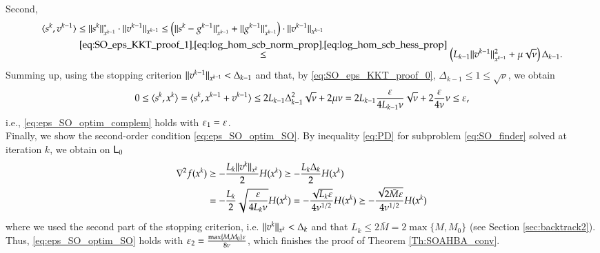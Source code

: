 Second, 
\begin{align*}
 \langle s^{k},v^{k-1}\rangle&\leq \lVert s^{k}\rVert^{\ast}_{x^{k-1}}\cdot\lVert v^{k-1}\rVert_{x^{k-1}}\leq \left(\lVert s^{k}-g^{k-1}\rVert^{\ast}_{x^{k-1}}+\lVert g^{k-1}\rVert^{\ast}_{x^{k-1}}\right)\cdot \lVert v^{k-1}\rVert_{x^{k-1}}\\
&\stackrel{\eqref{eq:SO_eps_KKT_proof_1},\eqref{eq:log_hom_scb_norm_prop},\eqref{eq:log_hom_scb_hess_prop}}{\leq}  \left( L_{k-1}\lVert v^{k-1}\rVert^{2}_{x^{k-1}}+\mu\sqrt{\nu}\right)\Delta_{k-1}.
\end{align*}
Summing up, using the stopping criterion $\lVert v^{k-1}\rVert_{x^{k-1}}<\Delta_{k-1}$ and that, by \eqref{eq:SO_eps_KKT_proof_0}, $\Delta_{k-1} \leq 1\leq\sqrt{\nu}$, we obtain
\begin{align}
 0 \leq \langle s^k,x^k\rangle = \langle s^k,x^{k-1}+v^{k-1}\rangle \leq  2L_{k-1}\Delta_{k-1}^2 \sqrt{\nu} + 2\mu \nu = 
2 L_{k-1} \frac{\varepsilon}{4L_{k-1}\nu}  \sqrt{\nu} + 2\frac{\varepsilon}{4\nu} \nu \leq  \varepsilon, \label{eq:SO_eps_KKT_proof_3}
\end{align}
i.e., \eqref{eq:eps_SO_optim_complem} holds with $\varepsilon_1=\varepsilon$.\\
Finally, we show the second-order condition \eqref{eq:eps_SO_optim_SO}.
By inequality \eqref{eq:PD} for subproblem \eqref{eq:SO_finder} solved at iteration $k$, we obtain on $\mathsf{L}_0$
\begin{align}
\nabla^2 f(x^{k})  &\succeq - \frac{L_{k}\lVert v^{k}\rVert_{x^{k}}}{2} H(x^{k}) \succeq -\frac{L_{k} \Delta_k}{2} H(x^{k}) \notag \\
& =  - \frac{L_{k}}{2}\sqrt{\frac{\varepsilon}{4L_{k}\nu}} H(x^{k}) = - \frac{\sqrt{L_k \varepsilon}}{4\nu^{1/2}}H(x^{k})  
\succeq - \frac{ \sqrt{2\bar{M}\varepsilon}}{4\nu^{1/2}}H(x^{k}) \label{eq:SO_eps_KKT_proof_4}
\end{align}
where we used the second part of the stopping criterion, i.e. $\lVert v^{k}\rVert_{x^{k}}< \Delta_k$ and that $L_k \leq 2\bar{M}=2\max\{M,M_0\}$ (see Section \ref{sec:backtrack2}). Thus, \eqref{eq:eps_SO_optim_SO} holds with $\varepsilon_2=\frac{\max\{M,M_0\}\varepsilon}{8\nu}$, which finishes the proof of Theorem \ref{Th:SOAHBA_conv}.



